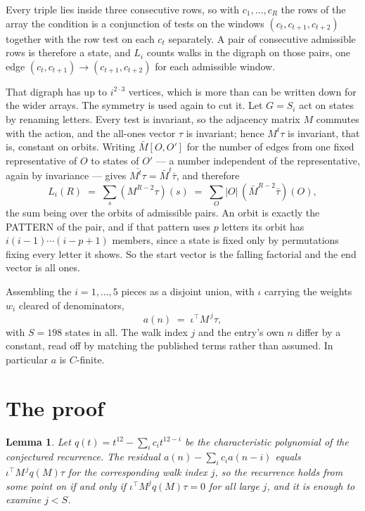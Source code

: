 \documentclass[11pt,a4paper]{article}
\theoremstyle{plain}
\newtheorem{lemma}[theorem]{Lemma}
\theoremstyle{definition}
\begin{document}
Every triple lies inside three consecutive rows, so with $c_1,\dots,c_R$ the rows of the array
the condition is a conjunction of tests on the windows $(c_{t},c_{t+1},c_{t+2})$ together
with the row test on each $c_t$ separately. A pair of consecutive admissible rows is therefore
a state, and $L_i$ counts walks in the digraph on those pairs, one edge $(c_t,c_{t+1})\to
(c_{t+1},c_{t+2})$ for each admissible window.

That digraph has up to $i^{2\cdot3}$ vertices, which is more than can be written down for
the wider arrays. The symmetry is used again to cut it. Let $G=S_i$ act on states by renaming
letters. Every test is invariant, so the adjacency matrix $M$ commutes with the action, and the
all-ones vector $\tau$ is invariant; hence $M^{t}\tau$ is invariant, that is, constant on
orbits. Writing $\bar M[O,O']$ for the number of edges from one fixed representative of $O$ to
states of $O'$ --- a number independent of the representative, again by invariance --- gives
$\overline{M^{t}\tau}=\bar M^{t}\bar\tau$, and therefore
\[
L_i(R)\;=\;\sum_{s}(M^{R-2}\tau)(s)\;=\;\sum_{O}|O|\,(\bar M^{R-2}\bar\tau)(O),
\]
the sum being over the orbits of admissible pairs. An orbit is exactly the PATTERN of the pair,
and if that pattern uses $p$ letters its orbit has $i(i-1)\cdots(i-p+1)$ members, since a state
is fixed only by permutations fixing every letter it shows. So the start vector is the falling
factorial and the end vector is all ones.

Assembling the $i=1,\dots,5$ pieces as a disjoint union, with $\iota$ carrying the weights
$w_i$ cleared of denominators,
\[
a(n)\;=\;\iota^{\!\top}M^{\,j}\tau ,
\]
with $S=198$ states in all. The walk index $j$ and the entry's own $n$ differ by a constant,
read off by matching the published terms rather than assumed. In particular $a$ is $C$-finite.

\section{The proof}

\begin{lemma}\label{lem:crit}
Let $q(t)=t^{12}-\sum_i c_it^{12-i}$ be the characteristic polynomial of the
conjectured recurrence. The residual $a(n)-\sum_ic_ia(n-i)$ equals
$\iota^{\!\top}M^{\,j}q(M)\tau$ for the corresponding walk index $j$, so the recurrence
holds from some point on if and only if $\iota^{\!\top}M^{j}q(M)\tau=0$ for all large $j$,
and it is enough to examine $j<S$.
\end{lemma}
\end{document}
